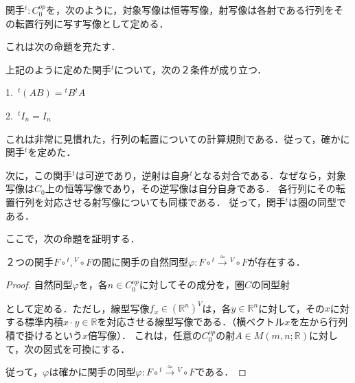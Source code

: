 \documentclass[uplatex, dvipdfmx]{jsreport}
\begin{document}
関手${}^t:C^{op}_0$を，次のように，対象写像は恒等写像，射写像は各射である行列をその転置行列に写す写像として定める．
\begin{center}\end{center}
これは次の命題を充たす．
\begin{proposition}
    上記のように定めた関手${}^t$について，次の２条件が成り立つ．\rm{}

    1.\, ${}^t\! (AB) = {}^t\! B{}^t\! A$

    2.\, ${}^t\! I_n = I_n$
\end{proposition}
これは非常に見慣れた，行列の転置についての計算規則である．従って，確かに関手${}^t$を定めた．

次に，この関手${}^t$は可逆であり，逆射は自身${}^t$となる対合である．なぜなら，対象写像は$C_0$上の恒等写像であり，その逆写像は自分自身である．
各行列にその転置行列を対応させる射写像についても同様である．
従って，関手${}^t$は圏の同型である．

ここで，次の命題を証明する．
\begin{proposition}
    ２つの関手$F\circ {}^t, {}^V\circ F$の間に関手の自然同型$\varphi :F\circ {}^t\xrightarrow{\simeq} {}^V\circ F$が存在する．
\end{proposition}
\begin{proof}
    自然同型$\varphi$を，各$n\in C_0^{op}$に対してその成分を，圏$C$の同型射
    \begin{center}\end{center}
    として定める．ただし，線型写像$f_x\in(\mathbb{R}^n)^V$は，各$y\in\mathbb{R}^n$に対して，その$x$に対する標準内積$x\cdot y\in\mathbb{R}$を対応させる線型写像である．（横ベクトル$x$を左から行列積で掛けるという$x$倍写像）．
    これは，任意の$C_0^{op}$の射$A\in M(m,n;\mathbb{R})$に対して，次の図式を可換にする．
    \begin{center}\end{center}
    従って，$\varphi$は確かに関手の同型$\varphi :F\circ {}^t\xrightarrow{\simeq} {}^V\circ F$である．
\end{proof}
\end{document}
